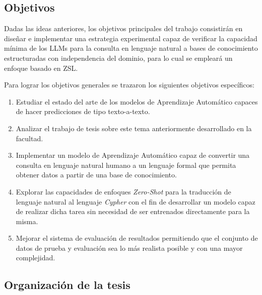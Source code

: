 \subsection*{Objetivos}
Dadas las ideas anteriores, los objetivos principales del trabajo consistirán en diseñar e implementar una estrategia experimental capaz de verificar la capacidad mínima de los LLMs para la consulta en lenguaje natural a bases de conocimiento estructuradas con independencia del dominio, para lo cual se empleará un enfoque basado en ZSL.

Para lograr los objetivos generales se trazaron los siguientes objetivos específicos:

\begin{enumerate}
	\item Estudiar el estado del arte de los modelos de Aprendizaje Automático capaces de hacer predicciones de tipo texto-a-texto.
	\item Analizar el trabajo de tesis sobre este tema anteriormente desarrollado en la facultad.
	\item Implementar un modelo de Aprendizaje Automático capaz de convertir una consulta en lenguaje natural humano a un lenguaje formal que permita obtener datos a partir de una 		base de conocimiento.
	\item Explorar las capacidades de enfoques \textit{Zero-Shot} para la traducción de lenguaje natural al lenguaje \textit{Cypher} con el fin de desarrollar un modelo capaz de realizar dicha tarea sin necesidad de ser entrenados directamente para la misma.
	\item Mejorar el sistema de evaluación de resultados permitiendo que el conjunto de datos de prueba y evaluación sea lo más realista posible y con una mayor complejidad.
\end{enumerate}

\subsection*{Organización de la tesis}


